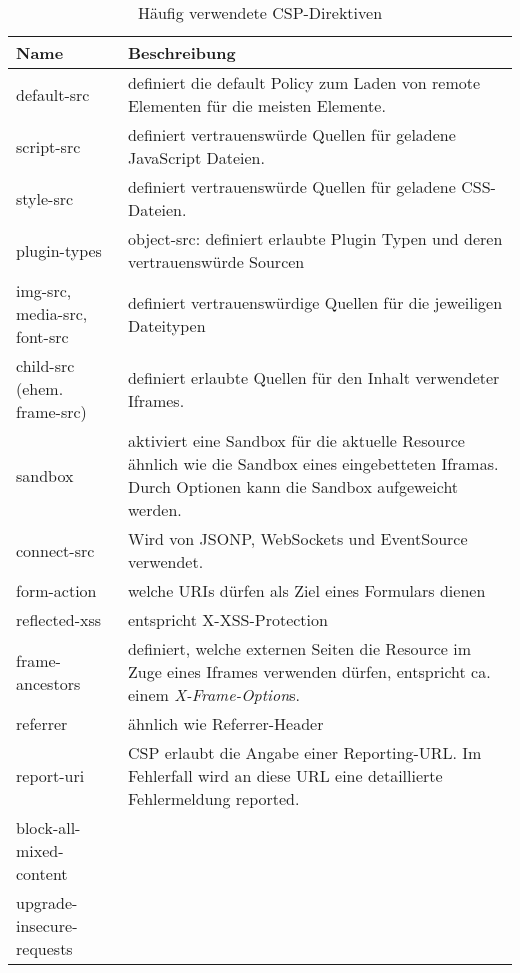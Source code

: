 \begin{table}
	\begin{center}
\begin{tabular}{lp{7cm}}
	\toprule
	Name & Beschreibung\\ \midrule
	default-src & definiert die default Policy zum Laden von remote Elementen für die meisten Elemente. \\
	script-src & definiert vertrauenswürde Quellen für geladene JavaScript Dateien. \\
	style-src & definiert vertrauenswürde Quellen für geladene CSS-Dateien. \\
	plugin-types & object-src: definiert erlaubte Plugin Typen und deren vertrauenswürde Sourcen \\
	img-src, media-src, font-src & definiert vertrauenswürdige Quellen für die jeweiligen Dateitypen \\
	child-src (ehem. frame-src) &  definiert erlaubte Quellen für den Inhalt verwendeter Iframes. \\
	sandbox & aktiviert eine Sandbox für die aktuelle Resource ähnlich wie die Sandbox eines eingebetteten Iframas. Durch Optionen kann die Sandbox aufgeweicht werden. \\
	connect-src & Wird von JSONP, WebSockets und EventSource verwendet. \\
	form-action & welche URIs dürfen als Ziel eines Formulars dienen \\
	reflected-xss & entspricht X-XSS-Protection \\
	frame-ancestors & definiert, welche externen Seiten die Resource im Zuge eines Iframes verwenden dürfen, entspricht ca. einem \textit{X-Frame-Option}s. \\
	referrer & ähnlich wie Referrer-Header \\
	report-uri & CSP erlaubt die Angabe einer Reporting-URL. Im Fehlerfall wird an diese URL eine detaillierte Fehlermeldung reported. \\
	block-all-mixed-content & \\
	upgrade-insecure-requests & \\
	\bottomrule
\end{tabular}
	\caption{Häufig verwendete CSP-Direktiven}
	\label{tbl:csp_elements}
\end{center}
\end{table}

